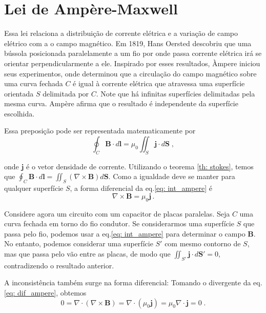 \section{Lei de Ampère-Maxwell}

Essa lei relaciona a distribuição de corrente elétrica e a variação de campo elétrico com a o campo magnético.
Em 1819, Hans Oersted descobriu que uma bússola posicionada paralelamente a um fio por onde passa corrente elétrica irá se orientar perpendicularmente a ele.
Inspirado por esses resultados, Àmpere iniciou seus experimentos, onde determinou que a circulação do campo magnético sobre uma curva fechada $C$ é igual à corrente elétrica que atravessa uma superfície orientada $S$ delimitada por $C$.
Note que há infinitas superfícies delimitadas pela mesma curva.
Ampère afirma que o resultado é independente da superfície escolhida.

Essa preposição pode ser representada matematicamente por
\begin{equation}
    \oint_C \mathbf B \cdot d\mathbf l = \mu_0 \iint_S \mathbf j \cdot d\mathbf S \;,
    \label{eq: int_ampere}
\end{equation}

\noindent onde $\mathbf j$ é o vetor densidade de corrente. Utilizando o teorema \ref{th: stokes}, temos que $\oint_C \mathbf B \cdot d\mathbf l = \iint_S (\nabla \times \mathbf B) d\mathbf S$. Como a igualdade deve se manter para qualquer superfície $S$, a forma diferencial da eq.\eqref{eq: int_ampere} é
\begin{equation}
    \nabla \times \mathbf B = \mu_0 \mathbf j \,.
    \label{eq: dif_ampere}
\end{equation}

Considere agora um circuito com um capacitor de placas paralelas.
Seja $C$ uma curva fechada em torno do fio condutor.
Se considerarmos uma superfície $S$ que passa pelo fio, podemos usar a eq.\eqref{eq: int_ampere} para determinar o campo $\mathbf B$.
No entanto, podemos considerar uma superfície $S'$ com mesmo contorno de $S$, mas que passa pelo vão entre as placas, de modo que $\iint_{S'} \mathbf j \cdot d\mathbf S' = 0$, contradizendo o resultado anterior.

A inconsistência também surge na forma diferencial:
Tomando o divergente da eq.\eqref{eq: dif_ampere}, obtemos
\begin{equation}
    0 = \nabla \cdot (\nabla \times \mathbf B) = \nabla \cdot (\mu_0 \mathbf j) = \mu_0 \nabla \cdot \mathbf j = 0 \;.
\end{equation}

